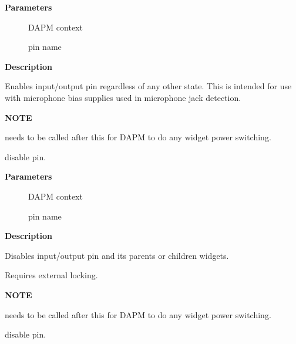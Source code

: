\documentclass[a4paper,8pt,english]{sphinxmanual}
\begin{document}
\textbf{Parameters}
\begin{description}
\item[{}] \leavevmode
DAPM context

\item[{}] \leavevmode
pin name

\end{description}

\textbf{Description}

Enables input/output pin regardless of any other state.  This is
intended for use with microphone bias supplies used in microphone
jack detection.

\textbf{NOTE}

{\hyperref[sound/kernel\string-api/alsa\string-driver\string-api:c.snd_soc_dapm_sync]{\emph{}}} needs to be called after this for DAPM to
do any widget power switching.

\begin{fulllineitems}
\label{sound/kernel-api/alsa-driver-api:c.snd_soc_dapm_disable_pin_unlocked}
disable pin.

\end{fulllineitems}


\textbf{Parameters}
\begin{description}
\item[{}] \leavevmode
DAPM context

\item[{}] \leavevmode
pin name

\end{description}

\textbf{Description}

Disables input/output pin and its parents or children widgets.

Requires external locking.

\textbf{NOTE}

{\hyperref[sound/kernel\string-api/alsa\string-driver\string-api:c.snd_soc_dapm_sync]{\emph{}}} needs to be called after this for DAPM to
do any widget power switching.

\begin{fulllineitems}
\label{sound/kernel-api/alsa-driver-api:c.snd_soc_dapm_disable_pin}
disable pin.

\end{fulllineitems}
\end{document}
